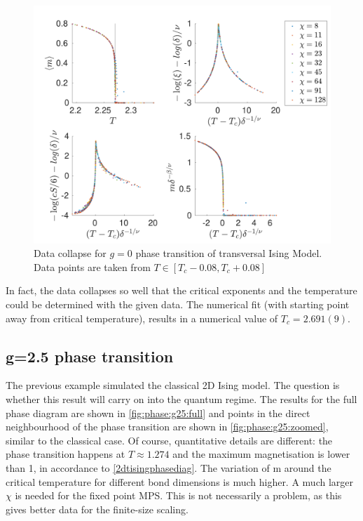 \begin{figure}[h!]
    \center
    \includegraphics[width=\textwidth]{Figuren/phasediag/g0/zoomed.pdf}
    \caption{ Data collapse for $g=0$ phase transition of transversal Ising Model. Data points are taken from $T \in \left[ T_c -0.08, T_c +0.08 \right]$ }
    \label{fig:phase:g0:zoomed}
\end{figure}
In fact, the data collapses so well that the critical exponents and the temperature could be determined with the given data. The numerical fit (with starting point away from  critical temperature), results in a numerical value of $T_c = 2.691(9) $.

\subsection{g=2.5 phase transition}

The previous example simulated the classical 2D Ising model. The question is whether this result will carry on into the quantum regime. The results for the full phase diagram are shown in \cref{fig:phase:g25:full} and points in the direct neighbourhood of the phase transition are shown in \cref{fig:phase:g25:zoomed}, similar to the classical case. Of course, quantitative details are different: the phase transition happens at $T\approx 1.274$ and the maximum magnetisation is lower than 1, in accordance to \cref{2dtisingphasediag}. The variation of m around the critical temperature for different bond dimensions is much higher. A much larger $\chi$ is needed for the fixed point \Gls{MPS}. This is not necessarily a problem, as this gives better data for the finite-size scaling.

